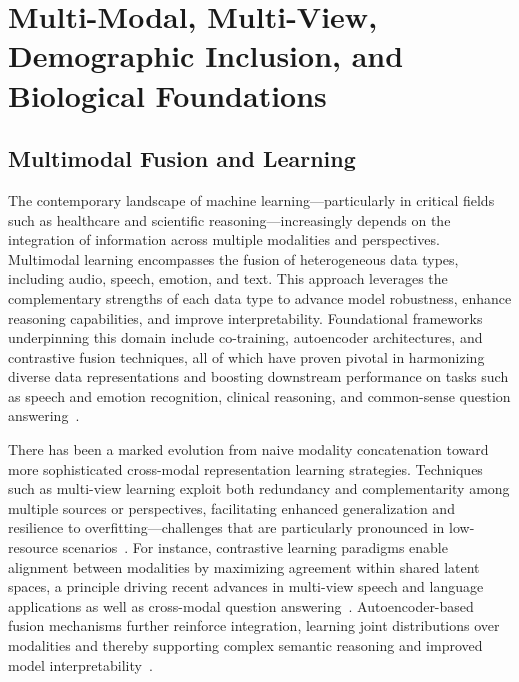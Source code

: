 \documentclass[sigconf]{acmart}
\begin{document}
\section{Multi-Modal, Multi-View, Demographic Inclusion, and Biological Foundations}

\subsection{Multimodal Fusion and Learning}

The contemporary landscape of machine learning—particularly in critical fields such as healthcare and scientific reasoning—increasingly depends on the integration of information across multiple modalities and perspectives. Multimodal learning encompasses the fusion of heterogeneous data types, including audio, speech, emotion, and text. This approach leverages the complementary strengths of each data type to advance model robustness, enhance reasoning capabilities, and improve interpretability. Foundational frameworks underpinning this domain include co-training, autoencoder architectures, and contrastive fusion techniques, all of which have proven pivotal in harmonizing diverse data representations and boosting downstream performance on tasks such as speech and emotion recognition, clinical reasoning, and common-sense question answering~\cite{ref79,ref31,ref36,ref46,ref47,ref48,ref49,ref50,ref55,ref60,ref74,ref75,ref80,ref87,ref88,ref89,ref90}.

There has been a marked evolution from naive modality concatenation toward more sophisticated cross-modal representation learning strategies. Techniques such as multi-view learning exploit both redundancy and complementarity among multiple sources or perspectives, facilitating enhanced generalization and resilience to overfitting—challenges that are particularly pronounced in low-resource scenarios~\cite{ref79}. For instance, contrastive learning paradigms enable alignment between modalities by maximizing agreement within shared latent spaces, a principle driving recent advances in multi-view speech and language applications as well as cross-modal question answering~\cite{ref31,ref79}. Autoencoder-based fusion mechanisms further reinforce integration, learning joint distributions over modalities and thereby supporting complex semantic reasoning and improved model interpretability~\cite{ref79,ref46,ref47}. 
\end{document}
